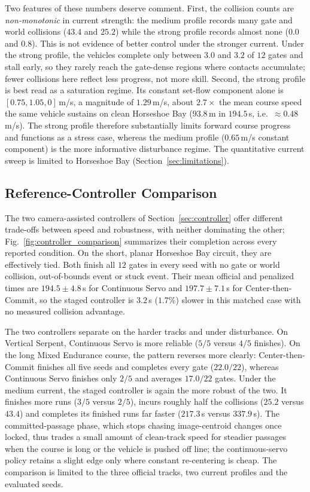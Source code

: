 Two features of these numbers deserve comment. First, the collision counts are \emph{non-monotonic} in current strength: the medium profile records many gate and world collisions ($43.4$ and $25.2$) while the strong profile records almost none ($0.0$ and $0.8$). This is not evidence of better control under the stronger current. Under the strong profile, the vehicles complete only between $3.0$ and $3.2$ of $12$ gates and stall early, so they rarely reach the gate-dense regions where contacts accumulate; fewer collisions here reflect less progress, not more skill. Second, the strong profile is best read as a saturation regime. Its constant set-flow component alone is $[0.75,1.05,0]$\,m/s, a magnitude of $1.29$\,m/s, about $2.7\times$ the mean course speed the same vehicle sustains on clean Horseshoe Bay ($93.8$\,m in $194.5$\,s, i.e.\ $\approx\!0.48$\,m/s). The strong profile therefore substantially limits forward course progress and functions as a stress case, whereas the medium profile ($0.65$\,m/s constant component) is the more informative disturbance regime. The quantitative current sweep is limited to Horseshoe Bay (Section~\ref{sec:limitations}).

\subsection{Reference-Controller Comparison}
\label{sec:eval_comparison}



The two camera-assisted controllers of Section~\ref{sec:controller} offer different trade-offs between speed and robustness, with neither dominating the other; Fig.~\ref{fig:controller_comparison} summarizes their completion across every reported condition. On the short, planar Horseshoe Bay circuit, they are effectively tied. Both finish all $12$ gates in every seed with no gate or world collision, out-of-bounds event or stuck event. Their mean official and penalized times are $194.5\pm4.8$\,s for Continuous Servo and $197.7\pm7.1$\,s for Center-then-Commit, so the staged controller is $3.2$\,s ($1.7\%$) slower in this matched case with no measured collision advantage.

The two controllers separate on the harder tracks and under disturbance. On Vertical Serpent, Continuous Servo is more reliable ($5/5$ versus $4/5$ finishes). On the long Mixed Endurance course, the pattern reverses more clearly: Center-then-Commit finishes all five seeds and completes every gate ($22.0/22$), whereas Continuous Servo finishes only $2/5$ and averages $17.0/22$ gates. Under the medium current, the staged controller is again the more robust of the two. It finishes more runs ($3/5$ versus $2/5$), incurs roughly half the collisions ($25.2$ versus $43.4$) and completes its finished runs far faster ($217.3$\,s versus $337.9$\,s). The committed-passage phase, which stops chasing image-centroid changes once locked, thus trades a small amount of clean-track speed for steadier passages when the course is long or the vehicle is pushed off line; the continuous-servo policy retains a slight edge only where constant re-centering is cheap. The comparison is limited to the three official tracks, two current profiles and the evaluated seeds.

